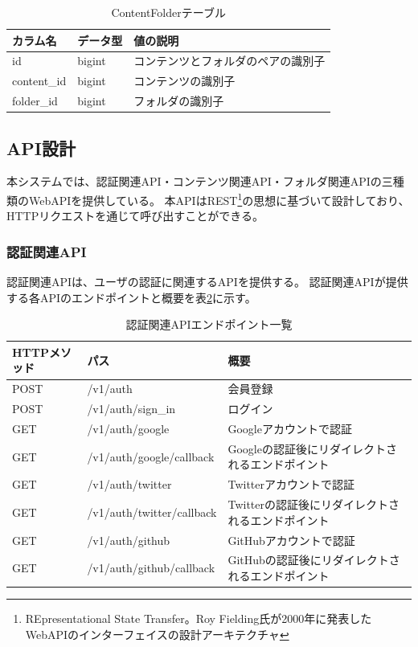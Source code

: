\begin{table}[htbp]
  \label{tb:design-content-folder-table}
  \caption{ContentFolderテーブル}
  \begin{center}
    \begin{tabular}{|l|l|l|}
      \hline
      カラム名 & データ型 & 値の説明 \\\hline\hline
      id & bigint & コンテンツとフォルダのペアの識別子 \\\hline
      content\_id & bigint & コンテンツの識別子 \\\hline
      folder\_id & bigint & フォルダの識別子 \\\hline
    \end{tabular}
  \end{center}
\end{table}

\subsection{API設計}
本システムでは、認証関連API・コンテンツ関連API・フォルダ関連APIの三種類のWebAPIを提供している。
本APIはREST\footnote{REpresentational State Transfer。Roy Fielding氏が2000年に発表したWebAPIのインターフェイスの設計アーキテクチャ}の思想に基づいて設計しており、HTTPリクエストを通じて呼び出すことができる。

\subsubsection{認証関連API}
認証関連APIは、ユーザの認証に関連するAPIを提供する。
認証関連APIが提供する各APIのエンドポイントと概要を表\ref{tb:design-auth-api}に示す。

\begin{table}[htbp]
  \label{tb:design-auth-api}
  \caption{認証関連APIエンドポイント一覧}
  \begin{center}
    \begin{tabular}{|l|l|l|}
      \hline
      HTTPメソッド & パス & 概要 \\\hline\hline
      POST & /v1/auth & 会員登録 \\\hline
      POST & /v1/auth/sign\_in & ログイン \\\hline
      GET & /v1/auth/google & Googleアカウントで認証 \\\hline
      GET & /v1/auth/google/callback & Googleの認証後にリダイレクトされるエンドポイント \\\hline
      GET & /v1/auth/twitter & Twitterアカウントで認証 \\\hline
      GET & /v1/auth/twitter/callback & Twitterの認証後にリダイレクトされるエンドポイント \\\hline
      GET & /v1/auth/github & GitHubアカウントで認証 \\\hline
      GET & /v1/auth/github/callback & GitHubの認証後にリダイレクトされるエンドポイント \\\hline
    \end{tabular}
  \end{center}
\end{table}

